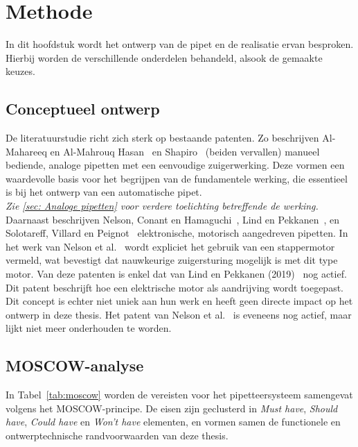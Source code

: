 \chapter{Methode}
In dit hoofdstuk wordt het ontwerp van de pipet en de realisatie ervan besproken. Hierbij worden de verschillende onderdelen behandeld, alsook de gemaakte keuzes.

\section{Conceptueel ontwerp}
De literatuurstudie richt zich sterk op bestaande patenten. Zo beschrijven Al-Mahareeq en Al-Mahrouq Hasan~\cite{RN17} en Shapiro~\cite{RN16} (beiden vervallen) manueel bediende, analoge pipetten met een eenvoudige zuigerwerking. Deze vormen een waardevolle basis voor het begrijpen van de fundamentele werking, die essentieel is bij het ontwerp van een automatische pipet.
\\\textit{Zie \autoref{sec: Analoge pipetten} voor verdere toelichting betreffende de werking.}
\\[12pt]Daarnaast beschrijven Nelson, Conant en Hamaguchi~\cite{RN35}, Lind en Pekkanen~\cite{RN36}, en Solotareff, Villard en Peignot~\cite{RN38} elektronische, motorisch aangedreven pipetten. In het werk van Nelson et al.~\cite{RN35} wordt expliciet het gebruik van een stappermotor vermeld, wat bevestigt dat nauwkeurige zuigersturing mogelijk is met dit type motor. Van deze patenten is enkel dat van Lind en Pekkanen (2019)~\cite{RN36} nog actief. Dit patent beschrijft hoe een elektrische motor als aandrijving wordt toegepast. Dit concept is echter niet uniek aan hun werk en heeft geen directe impact op het ontwerp in deze thesis. Het patent van Nelson et al.~\cite{RN35} is eveneens nog actief, maar lijkt niet meer onderhouden te worden.

\section{MOSCOW-analyse}
In Tabel~\ref{tab:moscow} worden de vereisten voor het pipetteersysteem samengevat volgens het MOSCOW-principe. De eisen zijn geclusterd in \textit{Must have}, \textit{Should have}, \textit{Could have} en \textit{Won’t have} elementen, en vormen samen de functionele en ontwerptechnische randvoorwaarden van deze thesis.

